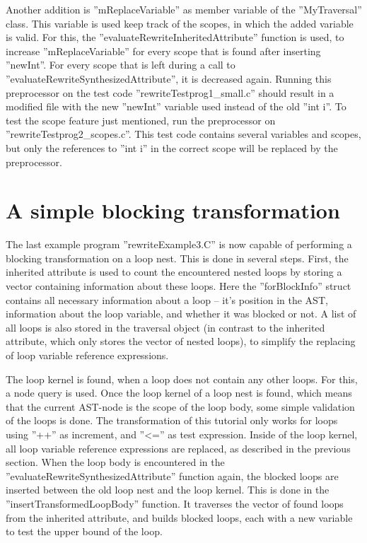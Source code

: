 Another addition is ''mReplaceVariable'' as member variable of the ''MyTraversal'' class.
This variable is used keep track of the scopes, in which the added variable is valid. 
For this, the ''evaluateRewriteInheritedAttribute'' function is used, to increase ''mReplaceVariable''
for every scope that is found after inserting ''newInt''. For every scope that is left
during a call to ''evaluateRewriteSynthesizedAttribute'', it is decreased again. Running
this preprocessor on the test code ''rewriteTestprog1\_small.c'' should result in a modified
file with the new ''newInt'' variable used instead of the old ''int i''. To test the
scope feature just mentioned, run the preprocessor on ''rewriteTestprog2\_scopes.c''. This
test code contains several variables and scopes, but only the references to ''int i'' in
the correct scope will be replaced by the preprocessor.

\section{A simple blocking transformation}

The last example program ''rewriteExample3.C'' is now capable of performing a blocking
transformation on a loop nest. This is done in several steps. First, the inherited attribute
is used to count the encountered nested loops by storing a
vector containing information about these loops. Here the ''forBlockInfo'' struct contains all necessary
information about a loop -- it's position in the AST, information about the loop variable,
and whether it was blocked or not. A list of all loops is also stored in the traversal object 
(in contrast to the inherited attribute, which only stores the vector of nested loops), to 
simplify the replacing of loop variable reference expressions.

The loop kernel is found, when a loop does not contain any other loops. For this,
a node query is used. Once the loop kernel of a loop nest is
found, which means that the current AST-node is the scope of the loop body, 
some simple validation of the loops is done. The transformation of this tutorial
only works for loops using ''++'' as increment, and ''<='' as test expression. Inside
of the loop kernel, all loop variable reference expressions are replaced, as described
in the previous section. When the loop body is encountered in the ''evaluateRewriteSynthesizedAttribute''
function again, the blocked loops are inserted between the old loop nest and
the loop kernel. This is done in the ''insertTransformedLoopBody'' function. It traverses
the vector of found loops from the inherited attribute, and builds blocked loops, each
with a new variable to test the upper bound of the loop.

